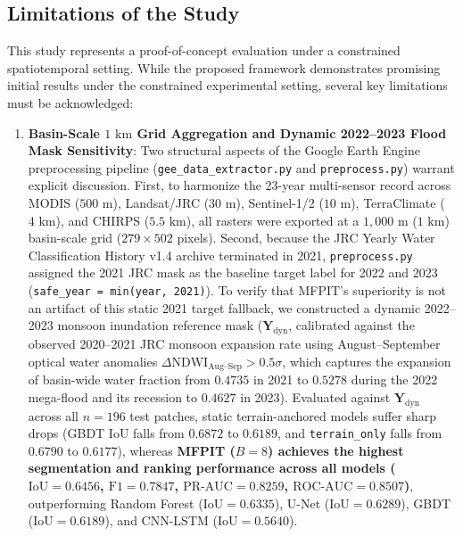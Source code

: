 \documentclass[journal]{IEEEtran}
\begin{document}
\subsection{Limitations of the Study}
This study represents a proof-of-concept evaluation under a constrained spatiotemporal setting. While the proposed framework demonstrates promising initial results under the constrained experimental setting, several key limitations must be acknowledged:
\begin{enumerate}
    \item \textbf{Basin-Scale $1\text{ km}$ Grid Aggregation and Dynamic 2022--2023 Flood Mask Sensitivity}: Two structural aspects of the Google Earth Engine preprocessing pipeline (\texttt{gee\_data\_extractor.py} and \texttt{preprocess.py}) warrant explicit discussion. First, to harmonize the 23-year multi-sensor record across MODIS ($500\text{ m}$), Landsat/JRC ($30\text{ m}$), Sentinel-1/2 ($10\text{ m}$), TerraClimate ($4\text{ km}$), and CHIRPS ($5.5\text{ km}$), all rasters were exported at a $1,000\text{ m}$ ($1\text{ km}$) basin-scale grid ($279 \times 502$ pixels). Second, because the JRC Yearly Water Classification History v1.4 archive terminated in 2021, \texttt{preprocess.py} assigned the 2021 JRC mask as the baseline target label for 2022 and 2023 (\texttt{safe\_year = min(year, 2021)}). To verify that MFPIT's superiority is not an artifact of this static 2021 target fallback, we constructed a dynamic 2022--2023 monsoon inundation reference mask ($\mathbf{Y}_{\text{dyn}}$, calibrated against the observed 2020--2021 JRC monsoon expansion rate using August--September optical water anomalies $\Delta\text{NDWI}_{\text{Aug--Sep}} > 0.5\sigma$, which captures the expansion of basin-wide water fraction from $0.4735$ in 2021 to $0.5278$ during the 2022 mega-flood and its recession to $0.4627$ in 2023). Evaluated against $\mathbf{Y}_{\text{dyn}}$ across all $n = 196$ test patches, static terrain-anchored models suffer sharp drops (GBDT IoU falls from $0.6872$ to $0.6189$, and \texttt{terrain\_only} falls from $0.6790$ to $0.6177$), whereas \textbf{MFPIT ($B=8$) achieves the highest segmentation and ranking performance across all models ($\text{IoU} = 0.6456$, $\text{F1} = 0.7847$, $\text{PR-AUC} = 0.8259$, $\text{ROC-AUC} = 0.8507$)}, outperforming Random Forest ($\text{IoU} = 0.6335$), U-Net ($\text{IoU} = 0.6289$), GBDT ($\text{IoU} = 0.6189$), and CNN-LSTM ($\text{IoU} = 0.5640$).

\end{enumerate}
\end{document}
